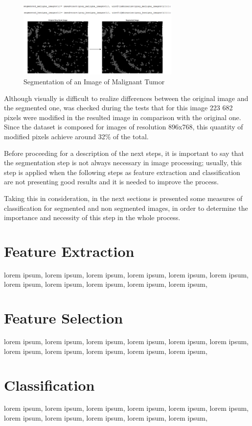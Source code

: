 \documentclass[conference]{IEEEtran}
\begin{document}
\begin{figure}[h]
    \centering
    \includegraphics[width=8cm]{images/imagem_segmentacao.png}
    \caption{Segmentation of an Image of Malignant Tumor}
    \label{fig:my_label}
\end{figure}

Although visually is difficult to realize differences between the original image and the segmented one, was checked during the tests that for this image 223 682 pixels were modified in the resulted image in comparison with the original one. Since the dataset is composed for images of resolution 896x768, this quantity of modified pixels achieve around 32\% of the total.\par
Before proceeding for a description of the next steps, it is important to say that the segmentation step is not always necessary in image processing; usually, this step is applied when the following steps as feature extraction and classification are not presenting good results and it is needed to improve the process.\par
Taking this in consideration, in the next sections is presented some measures of classification for segmented and non segmented images, in order to determine the importance and necessity of this step in the whole process.

\section{Feature Extraction}
lorem ipsum, lorem ipsum, lorem ipsum, lorem ipsum, lorem ipsum, lorem ipsum, lorem ipsum, lorem ipsum, lorem ipsum, lorem ipsum, lorem ipsum, 

\section{Feature Selection}
lorem ipsum, lorem ipsum, lorem ipsum, lorem ipsum, lorem ipsum, lorem ipsum, lorem ipsum, lorem ipsum, lorem ipsum, lorem ipsum, lorem ipsum, 

\section{Classification}
lorem ipsum, lorem ipsum, lorem ipsum, lorem ipsum, lorem ipsum, lorem ipsum, lorem ipsum, lorem ipsum, lorem ipsum, lorem ipsum, lorem ipsum, 
\end{document}

